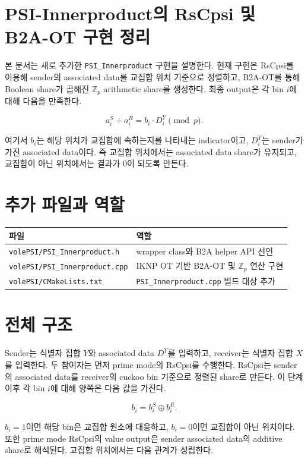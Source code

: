 \documentclass[11pt]{article}
\begin{document}
\sloppy

\section*{PSI-Innerproduct의 RsCpsi 및 B2A-OT 구현 정리}

본 문서는 새로 추가한 \texttt{PSI\_Innerproduct} 구현을 설명한다.
현재 구현은 RsCpsi를 이용해 sender의 associated data를 교집합 위치 기준으로
정렬하고, B2A-OT를 통해 Boolean share가 곱해진 \(\mathbb{Z}_p\) arithmetic
share를 생성한다. 최종 output은 각 bin \(i\)에 대해 다음을 만족한다.

\[
  a_i^S + a_i^R = b_i \cdot D_i^Y \pmod p.
\]

여기서 \(b_i\)는 해당 위치가 교집합에 속하는지를 나타내는 indicator이고,
\(D_i^Y\)는 sender가 가진 associated data이다. 즉 교집합 위치에서는
associated data share가 유지되고, 교집합이 아닌 위치에서는 결과가 0이 되도록
만든다.

\section*{추가 파일과 역할}

\begin{table}[h]
\centering
\begin{tabular}{ll}
\toprule
파일 & 역할 \\
\midrule
\texttt{volePSI/PSI\_Innerproduct.h} & wrapper class와 B2A helper API 선언 \\
\texttt{volePSI/PSI\_Innerproduct.cpp} & IKNP OT 기반 B2A-OT 및 \(\mathbb{Z}_p\) 연산 구현 \\
\texttt{volePSI/CMakeLists.txt} & \texttt{PSI\_Innerproduct.cpp} 빌드 대상 추가 \\
\bottomrule
\end{tabular}
\end{table}

\section*{전체 구조}

Sender는 식별자 집합 \(Y\)와 associated data \(D^Y\)를 입력하고, receiver는
식별자 집합 \(X\)를 입력한다. 두 참여자는 먼저 prime mode의 RsCpsi를 수행한다.
RsCpsi는 sender의 associated data를 receiver의 cuckoo bin 기준으로 정렬된 share로
만든다. 이 단계 이후 각 bin \(i\)에 대해 양쪽은 다음 값을 가진다.

\[
  b_i = b_i^S \oplus b_i^R.
\]

\(b_i=1\)이면 해당 bin은 교집합 원소에 대응하고, \(b_i=0\)이면 교집합이 아닌
위치이다. 또한 prime mode RsCpsi의 value output은 sender associated data의
additive share로 해석된다. 교집합 위치에서는 다음 관계가 성립한다.
\end{document}
